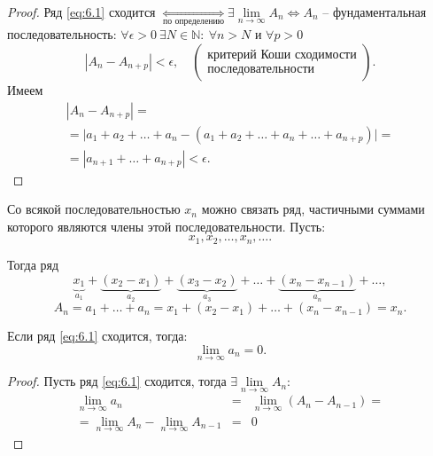 \begin{proof}
    Ряд \ref{eq:6.1} сходится $\underset{\text{по определению}}{\iff} \exists \underset{n\rightarrow\infty}{\lim}A_n \iff A_n$ -- фундаментальная последовательность: $\forall \epsilon > 0 \ \exists N \in \mathbb{N}: \ \forall n > N$ и $\forall p > 0$
    \[
        |A_n - A_{n+p}| < \epsilon, \quad \left(\begin{array}{c}
                \text{критерий Коши сходимости} \\
                \text{последовательности}
            \end{array}\right).
    \]
    Имеем
    \begin{multline*}
        |A_n - A_{n+p}| = \\
        =\big|a_1 + a_2 + \ldots + a_n - (a_1 + a_2 + \ldots + a_n + \ldots + a_{n+p})\big| = \\
        = |a_{n+1} + \ldots + a_{n+p}| < \epsilon.
    \end{multline*}
\end{proof}

\begin{remark}
    Со всякой последовательностью $x_n$ можно связать ряд, частичными суммами которого являются члены этой последовательности. Пусть:
    \[
        x_1,x_2,\ldots,x_n,\ldots.
    \]

    Тогда ряд
    \[
        \underbrace{x_1}_{a_1} + \underbrace{(x_2 - x_1)}_{a_2} + \underbrace{(x_3 - x_2)}_{a_3} + \ldots + \underbrace{(x_n - x_{n-1})}_{a_n} + \ldots,
    \]
    \[
        A_n = a_1 + \ldots + a_n = x_1 + (x_2 - x_1) + \ldots + (x_n - x_{n-1}) = x_n.
    \]
\end{remark}

\begin{theorem}
    Если ряд \ref{eq:6.1} сходится, тогда:
    \[
        \underset{n\rightarrow\infty}{\lim}a_n = 0.
    \]
\end{theorem}

\begin{proof}
    Пусть ряд \ref{eq:6.1} сходится, тогда $\exists \underset{n\rightarrow\infty}{\lim}A_n$:
    \begin{eqnarray*}
        \underset{n\rightarrow\infty}{\lim}a_n &=& \underset{n\rightarrow\infty}{\lim}(A_n - A_{n-1}) = \\
        = \underset{n\rightarrow\infty}{\lim}A_n - \underset{n\rightarrow\infty}{\lim}A_{n-1} &=& 0
    \end{eqnarray*}
\end{proof}

\newpage